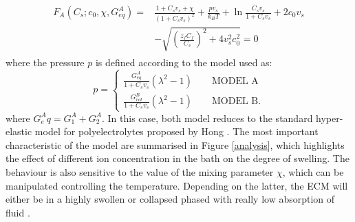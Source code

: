 \documentclass[runningheads]{llncs}
\begin{document}
\begin{gather}
\begin{aligned}
F_{A}(C_s; c_0,\chi,G^A_{eq})=&\frac{1+C_sv_s+\chi}{(1+C_sv_s)^2}+\frac{p v_s}{k_BT}+\ln \frac{C_sv_s}{1+C_sv_s} +2c_0v_s\\[1.5mm]
&-\sqrt{\left(\frac{z_fC_f}{C_s}\right)^2+4v_s^2c^2_0} =0 \label{eqF}
\end{aligned}
\end{gather}
where the pressure $p$ is defined according to the model used as:
\begin{equation}
p = \begin{cases}
\frac{G^A_{eq}}{1+C_sv_s}(\lambda^2-1)\qquad \text{MODEL A}\\
\frac{G^B_{vol}}{1+C_sv_s}(\lambda^2-1)\qquad \text{MODEL B}.
\end{cases}
\end{equation}
where $G^A_eq=G^A_1+G^A_2$. In this case, both model reduces to the standard hyper-elastic model for polyelectrolytes proposed by Hong \cite{Reviewpolyel}. The most important characteristic of the model are summarised in Figure \ref{analysis}, which highlights the effect of different ion concentration in the bath on the degree of swelling. The behaviour is also sensitive to the value of the mixing parameter $\chi$, which can be manipulated controlling the temperature. Depending on the latter, the ECM will either be in a highly swollen or collapsed phased with really low absorption of fluid \cite{Salt}. 
\end{document}
